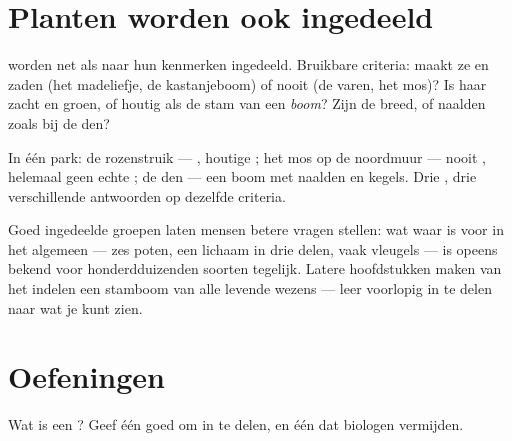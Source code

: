 \section{Planten worden ook ingedeeld}

\begin{proposition}\label{prop:g3:sorting-living-things:plants}
 worden net als  naar hun kenmerken ingedeeld. Bruikbare
criteria: maakt ze \emph{} en zaden (het madeliefje, de
kastanjeboom) of nooit (de varen, het mos)? Is haar  zacht en
groen, of houtig als de stam van een \emph{boom}? Zijn de 
breed, of naalden zoals bij de den?
\end{proposition}
\admitted

\begin{example}\label{ex:g3:sorting-living-things:park}
In één park: de rozenstruik --- , houtige ; het mos op
de noordmuur --- nooit , helemaal geen echte ; de den ---
een boom met naalden en kegels. Drie , drie verschillende
antwoorden op dezelfde criteria.
\end{example}

\begin{remark}\label{rem:g3:sorting-living-things:science}
Goed ingedeelde groepen laten mensen betere vragen stellen: wat waar is
voor  in het algemeen --- zes poten, een lichaam in drie delen,
vaak vleugels --- is opeens bekend voor honderdduizenden soorten
tegelijk. Latere hoofdstukken maken van het indelen een stamboom van
alle levende wezens --- leer voorlopig in te delen naar wat je kunt zien.
\end{remark}

\section{Oefeningen}

\begin{exercise}[$\star$]\label{exo:g3:sorting-living-things:1}
Wat is een ? Geef één goed  om  in te delen, en
één dat biologen vermijden.
\end{exercise}

